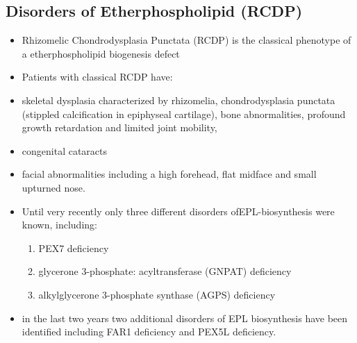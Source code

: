 \documentclass{scrartcl}
\begin{document}
\subsection{Disorders of Etherphospholipid (RCDP)}
\label{sec:orgcf6879a}
\begin{itemize}
\item Rhizomelic Chondrodysplasia Punctata (RCDP) is the classical
phenotype of a etherphospholipid biogenesis defect

\item Patients with classical RCDP have:
\item skeletal dysplasia characterized by rhizomelia, chondrodysplasia punctata (stippled calcification in epiphyseal cartilage), bone abnormalities, profound growth retardation and limited joint mobility,
\item congenital cataracts
\item facial abnormalities including a high forehead, flat midface and small upturned nose.
\item Until very recently only three different disorders ofEPL-biosynthesis were known, including:
\begin{enumerate}
\item PEX7 deficiency

\item glycerone 3-phosphate: acyltransferase (GNPAT) deficiency

\item alkylglycerone 3-phosphate synthase (AGPS) deficiency
\end{enumerate}

\item in the last two years two additional disorders of EPL biosynthesis have been identified including FAR1 deficiency and PEX5L deficiency.
\end{itemize}
\end{document}
